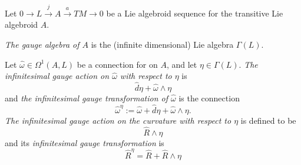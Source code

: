 


\linea

Let $0 \to L \xrightarrow{j} A \xrightarrow{a} TM \to 0$ be a Lie algebroid sequence for the transitive Lie algebroid $A$.

\begin{definition}
\emph{The gauge algebra of $A$} is the (infinite dimensional) Lie algebra $\Gamma(L)$.
\end{definition}

\begin{definition}\label{definitionInfinitesimalGaugeActionAndTransformationForAlgebroidFormsAndCurvature}
Let $\hat \omega \in \Omega^1(A, L)$ be a connection for on $A$, and let $\eta \in \Gamma(L)$. \emph{The infinitesimal gauge action on $\hat \omega$ with respect to $\eta$} is 
\begin{equation}
    \hat d \eta + \hat \omega \wedge \eta
\end{equation}
and \emph{the infinitesimal gauge transformation of $\hat \omega$} is the connection
\begin{equation}
    \hat \omega^\eta := \hat \omega + \hat d \eta + \hat \omega \wedge \eta.
\end{equation}
\emph{The infinitesimal gauge action on the curvature with respect to $\eta$} is defined to be
\begin{equation}
    \hat R \wedge \eta
\end{equation}
and its \emph{infinitesimal gauge transformation} is
\begin{equation}
    \hat R^\eta = \hat R + \hat R \wedge \eta
\end{equation}
\end{definition}

